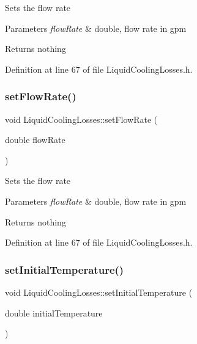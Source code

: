 Sets the flow rate


\begin{DoxyParams}{Parameters}
{\em flow\+Rate} & double, flow rate in gpm\\
\hline
\end{DoxyParams}
\begin{DoxyReturn}{Returns}
nothing 
\end{DoxyReturn}


Definition at line 67 of file Liquid\+Cooling\+Losses.\+h.

\mbox{\label{class_liquid_cooling_losses_a7739742c5f21919a62c304b7c525b1b6}} 
\subsubsection{\texorpdfstring{set\+Flow\+Rate()}{setFlowRate()}\hspace{0.1cm}{\footnotesize\ttfamily [3/3]}}
{\footnotesize\ttfamily void Liquid\+Cooling\+Losses\+::set\+Flow\+Rate (\begin{DoxyParamCaption}\item[{double}]{flow\+Rate }\end{DoxyParamCaption})\hspace{0.3cm}{\ttfamily [inline]}}

Sets the flow rate


\begin{DoxyParams}{Parameters}
{\em flow\+Rate} & double, flow rate in gpm\\
\hline
\end{DoxyParams}
\begin{DoxyReturn}{Returns}
nothing 
\end{DoxyReturn}


Definition at line 67 of file Liquid\+Cooling\+Losses.\+h.

\mbox{\label{class_liquid_cooling_losses_aa7f7718de77a96b8e269a06a24d297d8}} 
\subsubsection{\texorpdfstring{set\+Initial\+Temperature()}{setInitialTemperature()}\hspace{0.1cm}{\footnotesize\ttfamily [1/3]}}
{\footnotesize\ttfamily void Liquid\+Cooling\+Losses\+::set\+Initial\+Temperature (\begin{DoxyParamCaption}\item[{double}]{initial\+Temperature }\end{DoxyParamCaption})\hspace{0.3cm}{\ttfamily [inline]}}

